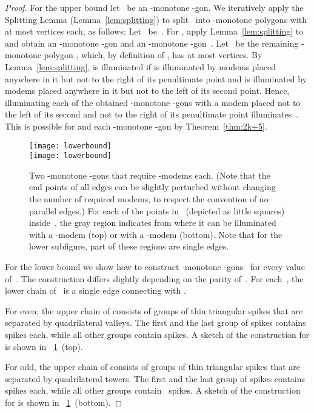 \documentclass[A4]{article}
\begin{document}
\begin{proof}
For the upper bound let~ be an -monotone -gon.
We iteratively apply the Splitting Lemma (Lemma~\ref{lem:splitting}) to split~ into  -monotone polygons with at most \mbox{} vertices each, as follows: 
Let~ be~.
For , apply Lemma~\ref{lem:splitting} to~ and obtain an -monotone \mbox{-gon}  and an -monotone \mbox{-gon}~.
Let~ be the remaining -monotone polygon , which, by definition of , has at most  vertices.
By Lemma~\ref{lem:splitting},  is illuminated if  is illuminated by modems placed anywhere in it but not to the right of its penultimate point and  is illuminated by modems placed anywhere in it but not to the left of its second point.
Hence, illuminating each of the obtained -monotone -gons  with a modem placed not to the left of its second and not to the right of its penultimate point illuminates~.
This is possible for  and each -monotone -gon by Theorem~\ref{thm:2k+5}.


\begin{figure}[htb]
  \centering
  \texttt{[image: lowerbound]} \\
  \vspace{3mm}
  \texttt{[image: lowerbound]} \\
  \caption{Two -monotone -gons that require  \mbox{-modems} each. 
    (Note that the end points of all edges can be slightly perturbed without changing the number of required modems, to respect the convention of no parallel edges.)
    For each of the points in~ (depicted as little squares) inside~, the gray region indicates from where it can be illuminated with a \mbox{-modem} (top) or with a \mbox{-modem} (bottom).
    Note that for the lower subfigure, part of these regions are single edges.  }
\label{fig:lower}
\end{figure}


For the lower bound we show how to construct -monotone -gons~ for every value of~. 
The construction differs slightly depending on the parity of~.
For each~, the lower chain of~ is a single edge connecting  with .

For  even, the upper chain of  consists of groups of thin triangular spikes that are separated by quadrilateral valleys. 
The first and the last group of spikes contains  spikes each, while all other groups contain  spikes. 
A sketch of the construction for  is shown in \figurename~\ref{fig:lower}~(top).


For  odd, the upper chain of  consists of groups of thin triangular spikes that are separated by quadrilateral towers. 
The first and the last group of spikes contains  spikes each, while all other groups contain~ spikes. 
A sketch of the construction for  is shown in \figurename~\ref{fig:lower}~(bottom).



\end{proof}
\end{document}
